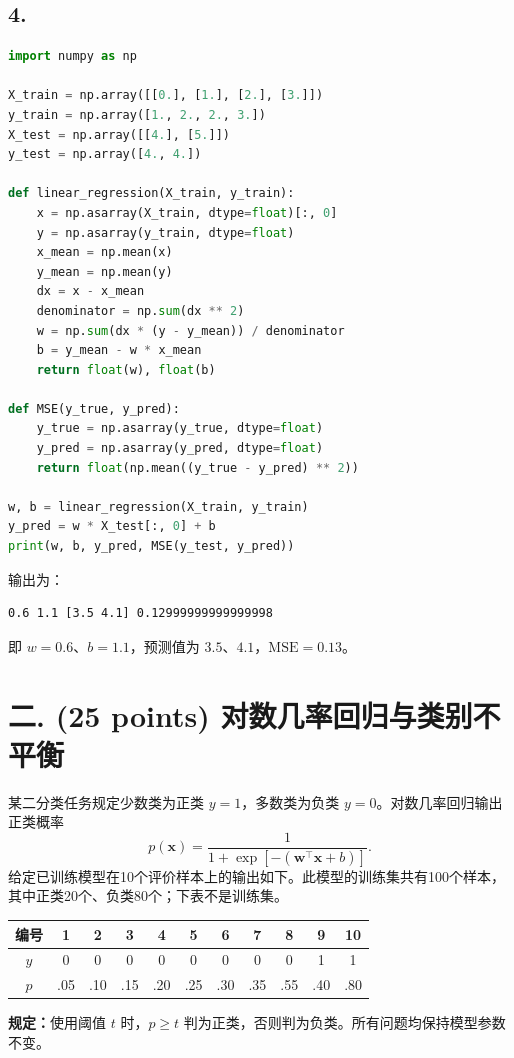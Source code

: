 \documentclass[10pt]{article}
\begin{document}
\subsection*{4.}
\begin{lstlisting}[language=Python,caption=一元线性回归与均方误差的完整实现]
import numpy as np

X_train = np.array([[0.], [1.], [2.], [3.]])
y_train = np.array([1., 2., 2., 3.])
X_test = np.array([[4.], [5.]])
y_test = np.array([4., 4.])

def linear_regression(X_train, y_train):
    x = np.asarray(X_train, dtype=float)[:, 0]
    y = np.asarray(y_train, dtype=float)
    x_mean = np.mean(x)
    y_mean = np.mean(y)
    dx = x - x_mean
    denominator = np.sum(dx ** 2)
    w = np.sum(dx * (y - y_mean)) / denominator
    b = y_mean - w * x_mean
    return float(w), float(b)

def MSE(y_true, y_pred):
    y_true = np.asarray(y_true, dtype=float)
    y_pred = np.asarray(y_pred, dtype=float)
    return float(np.mean((y_true - y_pred) ** 2))

w, b = linear_regression(X_train, y_train)
y_pred = w * X_test[:, 0] + b
print(w, b, y_pred, MSE(y_test, y_pred))
\end{lstlisting}
输出为：
\begin{lstlisting}
0.6 1.1 [3.5 4.1] 0.12999999999999998
\end{lstlisting}
即 $w=0.6$、$b=1.1$，预测值为 $3.5$、$4.1$，$\mathrm{MSE}=0.13$。


\newpage
\section*{二. (25 points) 对数几率回归与类别不平衡}
某二分类任务规定少数类为正类 $y=1$，多数类为负类 $y=0$。对数几率回归输出正类概率
\[
p(\mathbf{x})=\frac{1}{1+\exp[-(\textbf{w}^{\top}\mathbf{x}+b)]}.
\]
给定已训练模型在10个评价样本上的输出如下。此模型的训练集共有100个样本，其中正类20个、负类80个；下表不是训练集。
\begin{center}
\begin{tabular}{c*{10}{c}}
\toprule
编号 & 1 & 2 & 3 & 4 & 5 & 6 & 7 & 8 & 9 & 10 \\
\midrule
$y$ & 0 & 0 & 0 & 0 & 0 & 0 & 0 & 0 & 1 & 1 \\
$p$ & .05 & .10 & .15 & .20 & .25 & .30 & .35 & .55 & .40 & .80 \\
\bottomrule
\end{tabular}
\end{center}
\textbf{规定：}使用阈值 $t$ 时，$p\geq t$ 判为正类，否则判为负类。所有问题均保持模型参数不变。
\end{document}
